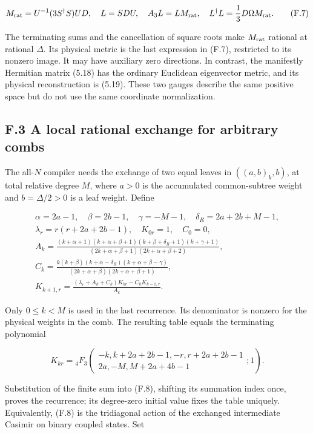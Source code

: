 \documentclass[a4paper,11pt]{article}
\numberwithin{equation}{section}
\begin{document}
\[
M_{\rm rat}=U^{-1}(3S^\dagger S)UD,
\quad L=SDU,
\quad A_3L=LM_{\rm rat},
\quad L^\dagger L=\frac13D\Omega M_{\rm rat}.
\tag{F.7}
\]

The terminating sums and the cancellation of square roots make \(M_{\rm rat}\) rational at rational \(\Delta\). Its physical metric is the last expression in (F.7), restricted to its nonzero image. It may have auxiliary zero directions. In contrast, the manifestly Hermitian matrix (5.18) has the ordinary Euclidean eigenvector metric, and its physical reconstruction is (5.19). These two gauges describe the same positive space but do not use the same coordinate normalization.

\hypertarget{f.3-a-local-rational-exchange-for-arbitrary-combs}{%
\subsection{F.3 A local rational exchange for arbitrary combs}\label{f.3-a-local-rational-exchange-for-arbitrary-combs}}

The all-\(N\) compiler needs the exchange of two equal leaves in \(((a,b)_k,b)\), at total relative degree \(M\), where \(a>0\) is the accumulated common-subtree weight and \(b=\Delta/2>0\) is a leaf weight. Define

\[
\begin{gathered}
\alpha=2a-1,\quad\beta=2b-1,\quad
\gamma=-M-1,\quad\delta_R=2a+2b+M-1,\\
\lambda_r=r(r+2a+2b-1),\quad K_{0r}=1,\quad C_0=0,\\
A_k=\frac{(k+\alpha+1)(k+\alpha+\beta+1)(k+\beta+\delta_R+1)(k+\gamma+1)}
{(2k+\alpha+\beta+1)(2k+\alpha+\beta+2)},\\
C_k=\frac{k(k+\beta)(k+\alpha-\delta_R)(k+\alpha+\beta-\gamma)}
{(2k+\alpha+\beta)(2k+\alpha+\beta+1)},\\
K_{k+1,r}=\frac{(\lambda_r+A_k+C_k)K_{kr}-C_kK_{k-1,r}}{A_k}.
\end{gathered}
\tag{F.8}
\]

Only \(0\le k<M\) is used in the last recurrence. Its denominator is nonzero for the physical weights in the comb. The resulting table equals the terminating polynomial

\[
K_{kr}={}_4F_3\!\left(
\begin{matrix}-k,k+2a+2b-1,-r,r+2a+2b-1\\
2a,-M,M+2a+4b-1\end{matrix};1\right).
\tag{F.9}
\]

Substitution of the finite sum into (F.8), shifting its summation index once, proves the recurrence; its degree-zero initial value fixes the table uniquely. Equivalently, (F.8) is the tridiagonal action of the exchanged intermediate Casimir on binary coupled states. Set
\end{document}
